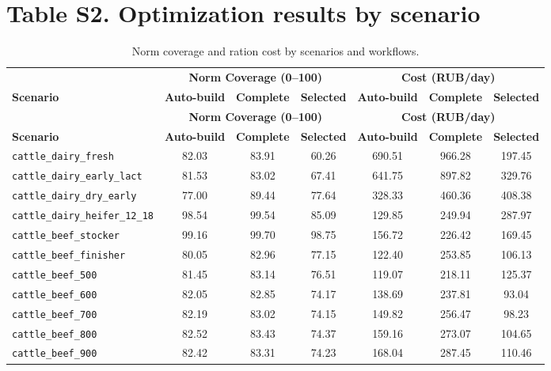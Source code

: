 \documentclass[11pt]{article}
\begin{document}
\section*{Table S2. Optimization results by scenario}
\begin{longtable}{lcccccc}
\caption{Norm coverage and ration cost by scenarios and workflows.}\label{tab:s2_cases} \\
\toprule
& \multicolumn{3}{c}{\textbf{Norm Coverage (0--100)}} & \multicolumn{3}{c}{\textbf{Cost (RUB/day)}} \\
\cmidrule(lr){2-4} \cmidrule(lr){5-7}
\textbf{Scenario} & \textbf{Auto-build} & \textbf{Complete} & \textbf{Selected} & \textbf{Auto-build} & \textbf{Complete} & \textbf{Selected} \\
\midrule
\endfirsthead
\toprule
& \multicolumn{3}{c}{\textbf{Norm Coverage (0--100)}} & \multicolumn{3}{c}{\textbf{Cost (RUB/day)}} \\
\cmidrule(lr){2-4} \cmidrule(lr){5-7}
\textbf{Scenario} & \textbf{Auto-build} & \textbf{Complete} & \textbf{Selected} & \textbf{Auto-build} & \textbf{Complete} & \textbf{Selected} \\
\midrule
\endhead
\bottomrule
\endfoot
\bottomrule
\endlastfoot
\texttt{cattle\_dairy\_fresh} & 82.03 & 83.91 & 60.26 & 690.51 & 966.28 & 197.45 \\
\texttt{cattle\_dairy\_early\_lact} & 81.53 & 83.02 & 67.41 & 641.75 & 897.82 & 329.76 \\
\texttt{cattle\_dairy\_dry\_early} & 77.00 & 89.44 & 77.64 & 328.33 & 460.36 & 408.38 \\
\texttt{cattle\_dairy\_heifer\_12\_18} & 98.54 & 99.54 & 85.09 & 129.85 & 249.94 & 287.97 \\
\texttt{cattle\_beef\_stocker} & 99.16 & 99.70 & 98.75 & 156.72 & 226.42 & 169.45 \\
\texttt{cattle\_beef\_finisher} & 80.05 & 82.96 & 77.15 & 122.40 & 253.85 & 106.13 \\
\texttt{cattle\_beef\_500} & 81.45 & 83.14 & 76.51 & 119.07 & 218.11 & 125.37 \\
\texttt{cattle\_beef\_600} & 82.05 & 82.85 & 74.17 & 138.69 & 237.81 & 93.04 \\
\texttt{cattle\_beef\_700} & 82.19 & 83.02 & 74.15 & 149.82 & 256.47 & 98.23 \\
\texttt{cattle\_beef\_800} & 82.52 & 83.43 & 74.37 & 159.16 & 273.07 & 104.65 \\
\texttt{cattle\_beef\_900} & 82.42 & 83.31 & 74.23 & 168.04 & 287.45 & 110.46 \\

\end{longtable}
\end{document}
